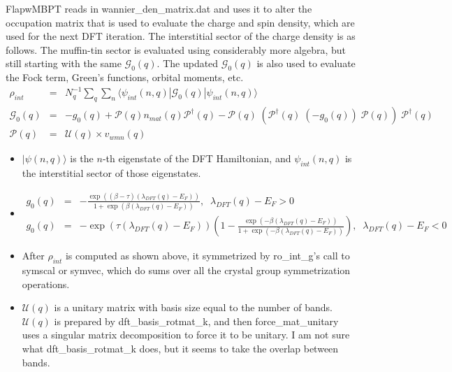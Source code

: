 \documentclass[aps,prb,singlecolumn,preprintnumbers,amsmath,amssymb]{revtex4}
\begin{document}
FlapwMBPT reads in wannier\_den\_matrix.dat and uses it to alter the occupation matrix that is used to evaluate the charge and spin density, which are used for the next DFT iteration.  The interstitial sector of the charge density is as follows. The muffin-tin sector is evaluated using considerably more algebra, but still starting with the same $ \mathcal{G}_0(q)$. The updated $ \mathcal{G}_0(q)$ is also used to evaluate the Fock term, Green's functions, orbital moments, etc.
\begin{eqnarray}
\rho_{int} &=& N_q^{-1} \sum_q \sum_n  \langle \psi_{int}(n,q) |  \mathcal{G}_0(q) | \psi_{int}(n,q) \rangle \nonumber \\
\mathcal{G}_0(q) &=& -g_0(q) + \mathcal{P}(q) n_{mat}(q)  \mathcal{P}^\dagger(q) - \mathcal{P}(q) \; ( \mathcal{P}^\dagger(q) \; (-g_0(q)) \; \mathcal{P}(q) ) \;  \mathcal{P}^\dagger(q) \nonumber \\
\mathcal{P}(q) &=& \mathcal{U}(q) \times v_{wmn}(q) \nonumber 
\end{eqnarray}
\begin{itemize}
\item $| \psi(n,q) \rangle $ is the $n$-th eigenstate of the DFT Hamiltonian, and  $\psi_{int}(n,q) $ is the interstitial sector of those eigenstates. 
\item  
\begin{eqnarray}
g_0(q) &=& - \frac{\exp((\beta - \tau)  (\lambda_{DFT}(q)-E_F)) }{ 1 + \exp(\beta (\lambda_{DFT}(q)-E_F)) }, \;\; \lambda_{DFT}(q)-E_F > 0
\nonumber \\
g_0(q) &=& - \exp(\tau (\lambda_{DFT}(q)-E_F))(1-  \frac{ \exp(- \beta  (\lambda_{DFT}(q)-E_F)) }{ 1 + \exp(-\beta (\lambda_{DFT}(q)-E_F)) }), \;\; \lambda_{DFT}(q)-E_F <0 \nonumber  %
\end{eqnarray}
\item After $\rho_{int}$ is computed as shown above, it symmetrized by ro\_int\_g's call to symscal or symvec, which do sums over all the crystal group symmetrization operations.
\item $ \mathcal{U}(q)$ is a unitary matrix with basis size equal to the number of bands. $ \mathcal{U}(q)$ is  prepared by dft\_basis\_rotmat\_k, and then force\_mat\_unitary uses a singular matrix decomposition to force it to be unitary.  I am not sure what dft\_basis\_rotmat\_k does, but it seems to take the overlap between bands.
\end{itemize}
\end{document}
